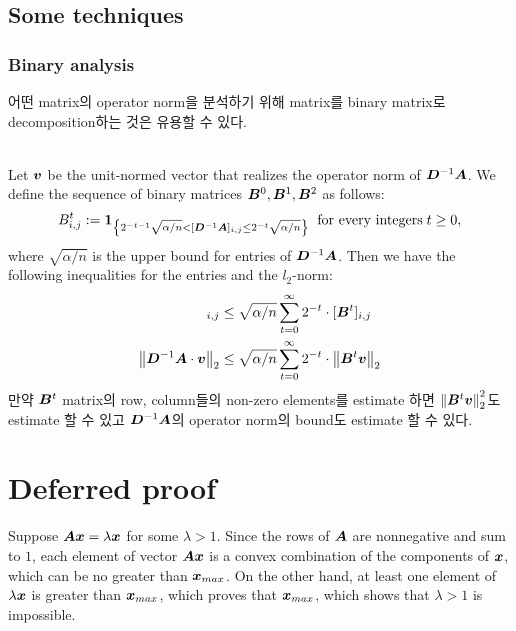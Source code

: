 \documentclass[10pt]{article}
\begin{document}
\subsection{Some techniques}
\subsubsection{Binary analysis}
어떤 matrix의 operator norm을 분석하기 위해 matrix를 binary matrix로 decomposition하는 것은 유용할 수 있다.  \\~\\ 

\begin{ginzabox}[Example]
Let ${\bm{v}}$ be the unit-normed vector that realizes the operator norm of ${\bm{D}}^{-1} {\bm{A}}$. We define the sequence of binary matrices ${\bm{B}}^0, {\bm{B}}^1, {\bm{B}}^2$ as follows:
\begin{equation}
    B_{i,j}^t := \mathbf{1}_{\left\{ 2^{-t-1}\sqrt{\alpha /n} < [{\bm{D}}^{-1} {\bm{A}}]_{i,j} \leq 2^{-t} \sqrt{\alpha/ n} \right\}} \; \text{\;for every integers\;} t \geq 0,  
\end{equation}
where $\sqrt{\alpha/n}$ is the upper bound for entries of ${\bm{D}}^{-1} {\bm{A}}$.  Then we have the following inequalities for the entries and the $l_2$-norm: 
\begin{align}
    [\mD^{-1} \mA]_{i, j} &\leq \sqrt{\alpha /n } \sum_{t=0}^{\infty} 2^{-t} \cdot [\mB^t]_{i, j} \\ 
    \norm{\mD^{-1} \mA \cdot \vv}_2 &\leq \sqrt{\alpha /n} \sum_{t=0}^{\infty} 2^{-t} \cdot \norm{\mB^t \vv}_2 
\end{align}
만약 ${\bm{B}}^t$ matrix의 row, column들의 non-zero elements를 estimate 하면 $\left\lVert{\bm{B}}^t {\bm{v}}\right\rVert_2^2$도 estimate 할 수 있고 ${\bm{D}}^{-1} {\bm{A}}$의 operator norm의 bound도 estimate 할 수 있다.
\end{ginzabox}
\section*{Deferred proof}
Suppose ${\bm{A}} {\bm{x}} = \lambda {\bm{x}}$ for some $\lambda >1$. Since the rows of ${\bm{A}}$ are nonnegative and sum to $1$, each element of vector ${\bm{A}} {\bm{x}}$ is a convex combination of the components of ${\bm{x}}$, which can be no greater than ${\bm{x}}_{max}$. On the other hand, at least one element of $\lambda {\bm{x}}$ is greater than ${\bm{x}}_{max}$, which proves that ${\bm{x}}_{max}$, which shows that $\lambda >1$ is impossible. 


\end{document}
